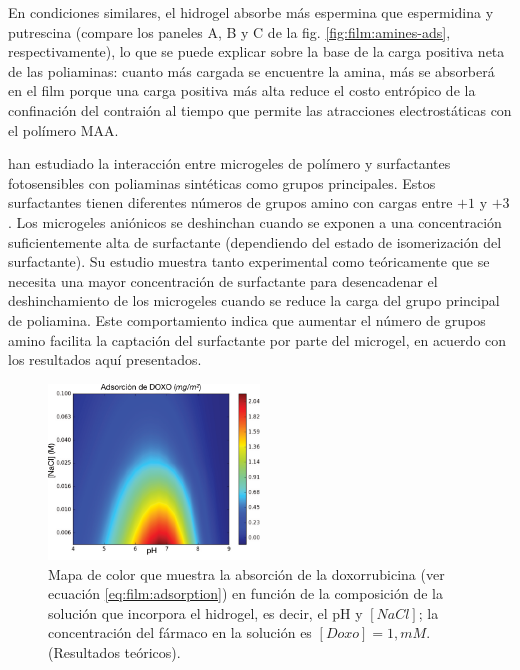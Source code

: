 En condiciones similares, el hidrogel absorbe m\'as espermina que espermidina y putrescina (compare los paneles A, B y C de la fig.  \ref{fig:film:amines-ads}, respectivamente), lo que se puede explicar sobre la base de la carga positiva neta de las poliaminas: cuanto m\'as cargada se encuentre la amina, m\'as se absorber\'a en el film porque una carga positiva m\'as alta reduce el costo entr\'opico de la confinaci\'on del contrai\'on al tiempo que permite las atracciones electrost\'aticas con el pol\'imero MAA.

\citet{Schimka2017} han estudiado la interacci\'on entre microgeles de pol\'imero y surfactantes fotosensibles con poliaminas sint\'eticas como grupos principales. Estos surfactantes tienen diferentes n\'umeros de grupos amino con cargas entre $+1$ y $+3$. Los microgeles ani\'onicos se deshinchan cuando se exponen a una concentraci\'on suficientemente alta de surfactante (dependiendo del estado de isomerizaci\'on del surfactante). Su estudio muestra tanto experimental como te\'oricamente que se necesita una mayor concentraci\'on de surfactante para desencadenar el deshinchamiento de los microgeles cuando se reduce la carga del grupo principal de poliamina. Este comportamiento indica que aumentar el n\'umero de grupos amino facilita la captaci\'on del surfactante por parte del microgel, en acuerdo con los resultados aqu\'i presentados.




\begin{figure}[!htb]
	\centering
	\includegraphics[width=0.5\textwidth]{Figures/graph-film/doxo_load.pdf}
	\caption{Mapa de color que muestra la absorci\'on de la doxorrubicina (ver ecuaci\'on \ref{eq:film:adsorption}) en funci\'on de la composici\'on de la soluci\'on que incorpora el hidrogel, es decir, el pH y $[NaCl]$; la concentraci\'on del f\'armaco en la soluci\'on es $[Doxo]=1, mM$. (Resultados te\'oricos).}
	\label{fig:film:doxo-load}
\end{figure}


